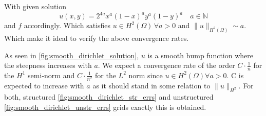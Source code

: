 \documentclass[11pt,a4paper]{article}
\begin{document}
With given solution
$$ u(x,y) = 2^{4a} x^a (1-x)^a y^a (1-y)^a \quad a \in \mathbb{N} $$
and $f$ accordingly.
Which satisfies $u \in H^2(\Omega)\,\forall a > 0$
and $\lVert u \rVert_{H^2(\Omega)} \sim a$.
Which make it ideal to verify the above convergence rates.

As seen in \ref{fig:smooth_dirichlet_solution}, $u$ is a smooth bump function where the steepness
increases with $a$.
We expect a convergence rate of the order $C\cdot\frac{1}{n}$ for the $H^1$ semi-norm
and $C\cdot\frac{1}{n^2}$ for the $L^2$ norm since $u \in H^2(\Omega) \forall a > 0$.
C is expected to increase with $a$ as it should stand in some relation to $\lVert u \rVert_{H^2}$.
For both, structured \ref{fig:smooth_dirichlet_str_errs} and unstructured \ref{fig:smooth_dirichlet_unstr_errs}
grids exactly this is obtained.
\end{document}
